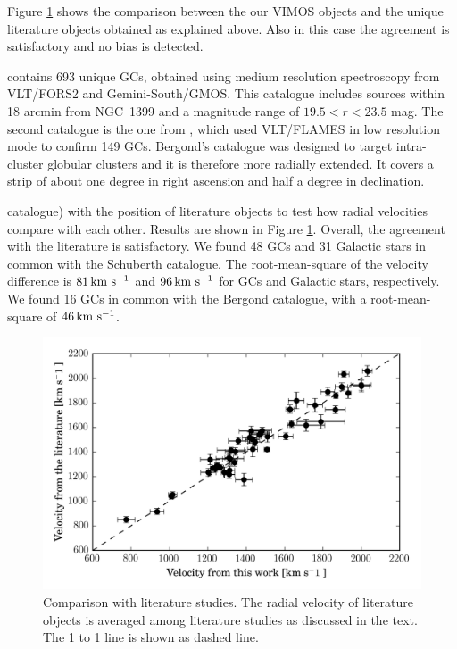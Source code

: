 \documentclass[useAMS,usenatbib]{mn2e}
\newcommand{\kms}{\mbox{\,km~s$^{-1}$}}
\begin{document}
Figure \ref{fig:vel_comparison} shows the comparison between the our VIMOS 
objects and the unique literature objects obtained as explained above. Also in 
this case the agreement is satisfactory and no bias is detected. 

\citep{Schuberth} contains 693 unique GCs, obtained using medium resolution 
spectroscopy from VLT/FORS2 and Gemini-South/GMOS. This catalogue includes 
sources within 18 arcmin from NGC~1399 and a magnitude range of $19.5<r<23.5$ 
mag. The second catalogue is the one from \citet{Bergond07}, which used 
VLT/FLAMES in low resolution mode to confirm 149 GCs. Bergond's catalogue was 
designed to target intra-cluster globular clusters and it is therefore more 
radially extended. It covers a strip of about one degree in right ascension and 
half a degree in declination. 

catalogue) with the position of literature objects to test how radial 
velocities compare with each other. Results are shown in Figure 
\ref{fig:vel_comparison}. Overall, the agreement with the literature is 
satisfactory. We found 48 GCs and 31 Galactic stars in common with the 
Schuberth catalogue. The root-mean-square of the velocity difference is 
$81\kms$ and $96\kms$ for GCs and Galactic stars, respectively. We found 16 GCs 
in common with the Bergond catalogue, with a root-mean-square of $46 \kms$. 

\begin{figure}
\centering
\includegraphics[width=\columnwidth]{figures/vel_literature.png} 
\caption{Comparison with literature studies. The radial velocity of literature 
objects is averaged among literature studies as discussed in the text. The 1 to 
1 line is shown as dashed line. }
\label{fig:vel_comparison}
\end{figure}
\end{document}
